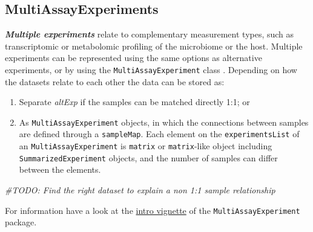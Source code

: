 \documentclass[
]{book}
\newenvironment{Shaded}{\begin{snugshade}}{\end{snugshade}}
\newcommand{\CommentTok}[1]{\textcolor[rgb]{0.56,0.35,0.01}{\textit{#1}}}
\providecommand{\tightlist}{%
  \setlength{\itemsep}{0pt}\setlength{\parskip}{0pt}}
\begin{document}
\hypertarget{mae}{%
\subsection{MultiAssayExperiments}\label{mae}}

\emph{\textbf{Multiple experiments}} relate to complementary measurement types,
such as transcriptomic or metabolomic profiling of the microbiome or
the host. Multiple experiments can be represented using the same
options as alternative experiments, or by using the
\texttt{MultiAssayExperiment} class \citep{Ramos2017}. Depending on how the
datasets relate to each other the data can be stored as:

\begin{enumerate}
\def\labelenumi{\arabic{enumi}.}
\tightlist
\item
  Separate \emph{altExp} if the samples can be matched directly 1:1; or
\item
  As \texttt{MultiAssayExperiment} objects, in which the connections between
  samples are defined through a \texttt{sampleMap}. Each element on the
  \texttt{experimentsList} of an \texttt{MultiAssayExperiment} is \texttt{matrix} or
  \texttt{matrix}-like object including \texttt{SummarizedExperiment} objects, and the
  number of samples can differ between the elements.
\end{enumerate}

\begin{Shaded}
\begin{Highlighting}[]
\CommentTok{\#TODO: Find the right dataset to explain a non 1:1 sample relationship}
\end{Highlighting}
\end{Shaded}

For information have a look at the \href{https://bioconductor.org/packages/release/bioc/vignettes/MultiAssayExperiment/inst/doc/MultiAssayExperiment.html}{intro vignette} of the \texttt{MultiAssayExperiment} package.
\end{document}
